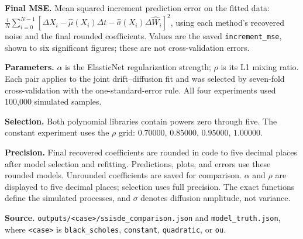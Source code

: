 \documentclass[10pt,a4paper,landscape]{article}
\begin{document}
{\small
\textbf{Final MSE.} Mean squared increment prediction error on the fitted data:
$\frac{1}{N}\sum_{i=0}^{N-1}[\Delta X_i-\widehat{\mu}(X_i)\Delta t
-\widehat{\sigma}(X_i)\Delta\widehat{W}_i]^2$, using each method's recovered
noise and the final rounded coefficients. Values are the saved
\texttt{increment\_mse}, shown to six significant figures; these are not
cross-validation errors.\par
\vspace{4pt}
\textbf{Parameters.} $\alpha$ is the ElasticNet regularization strength;
$\rho$ is its L1 mixing ratio. Each pair applies to the joint drift--diffusion
fit and was selected by seven-fold cross-validation with the one-standard-error
rule. All four experiments used 100,000 simulated samples.\par
\vspace{4pt}
\textbf{Selection.} Both polynomial libraries contain powers zero through five.
The constant experiment uses the
$\rho$ grid: $0.70000,\,0.85000,\,0.95000,\,1.00000$.\par
\vspace{4pt}
\textbf{Precision.} Final recovered coefficients are rounded in code to five
decimal places after model selection and refitting. Predictions, plots, and
errors use these rounded models. Unrounded coefficients are saved for comparison.
$\alpha$ and $\rho$ are displayed to five decimal places; selection uses full
precision. The exact functions define the simulated processes, and $\sigma$
denotes diffusion amplitude, not variance.\par
\vspace{4pt}
\textbf{Source.} \texttt{outputs/<case>/ssisde\_comparison.json} and
\texttt{model\_truth.json},
where \texttt{<case>} is \texttt{black\_scholes}, \texttt{constant},
\texttt{quadratic}, or \texttt{ou}.
}
\end{document}
